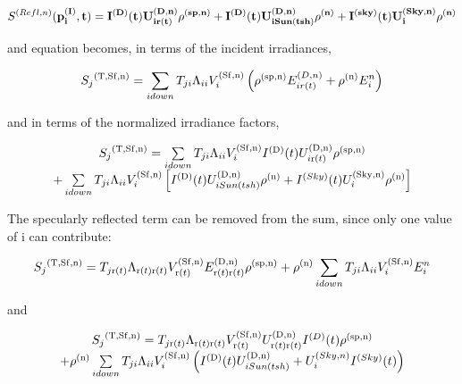 \begin{equation}
S^{(Refl,n)}(\bf{p}_i^{(I)},t) = 
  I^{(D)}(t) U_{i r(t)}^{(D,n)} \rho^{(sp,n)} +
  I^{(D)}(t) U_{i Sun(tsh)}^{(D,n)} \rho^{(n)} +
  I^{(sky)}(t) U_i^{(Sky,n)} \rho^{(n)}
\end{equation}

and equation becomes, in terms of the incident irradiances,

\begin{equation}
{S_j}^{{\rm{(T, Sf, n)}}} = \sum\limits_{i{\rm{ }}down} {{T_{ji}}{\Lambda_{ii}}V_i^{{\rm{(Sf, n)}}}\left( {{\rho ^{{\rm{(sp, n)}}}}E_{i{\rm{ }}r(t)}^{(D,n)} + {\rho ^{{\rm{(n)}}}}E_i^n} \right)}
\end{equation}

and in terms of the normalized irradiance factors,

\begin{equation}
\begin{array}{c}{S_j}^{{\rm{(T, Sf, n)}}} = \sum\limits_{i{\rm{ }}down} {{T_{ji}}{\Lambda_{ii}}V_i^{{\rm{(Sf, n)}}}{I^{{\rm{(D)}}}}(t)U_{i{\rm{ r(}}t{\rm{)}}}^{{\rm{(D,n)}}}{\rho ^{{\rm{(sp, n)}}}}} \\ + \sum\limits_{i{\rm{ }}down} {{T_{ji}}{\Lambda_{ii}}V_i^{{\rm{(Sf, n)}}}\left[ {{I^{{\rm{(D)}}}}(t)U_{i{\rm{ }}Sun(tsh)}^{{\rm{(D,n)}}}{\rho ^{{\rm{(n)}}}} + {I^{(Sky)}}(t)U_i^{{\rm{(Sky,n)}}}{\rho ^{{\rm{(n)}}}}} \right]} \end{array}
\end{equation}

The specularly reflected term can be removed from the sum, since only one value of i can contribute:

\begin{equation}
{S_j}^{{\rm{(T, Sf, n)}}} = {T_{j{\rm{ r(}}t{\rm{)}}}}{\Lambda_{{\rm{ r(}}t{\rm{) r(}}t{\rm{)}}}}V_{{\rm{ r(}}t{\rm{)}}}^{{\rm{(Sf, n)}}}E_{{\rm{ r(}}t{\rm{) r(}}t{\rm{)}}}^{{\rm{(D,n)}}}{\rho ^{{\rm{(sp, n)}}}} + {\rho ^{{\rm{(n)}}}}\sum\limits_{i{\rm{ }}down} {{T_{ji}}{\Lambda_{ii}}V_i^{{\rm{(Sf, n)}}}E_i^n}
\end{equation}

and

\begin{equation}
\begin{array}{c}{S_j}^{{\rm{(T, Sf, n)}}} = {T_{j{\rm{ r(}}t{\rm{)}}}}{\Lambda_{{\rm{ r(}}t{\rm{) r(}}t{\rm{)}}}}V_{{\rm{ r(}}t{\rm{)}}}^{{\rm{(Sf, n)}}}U_{{\rm{ r(}}t{\rm{) r(}}t{\rm{)}}}^{{\rm{(D,n)}}}{I^{(D)}}(t){\rho ^{{\rm{(sp, n)}}}}\\ + {\rho ^{{\rm{(n)}}}}\sum\limits_{i{\rm{ }}down} {{T_{ji}}{\Lambda_{ii}}V_i^{{\rm{(Sf, n)}}}\left( {{I^{{\rm{(D)}}}}(t)U_{i{\rm{ }}Sun(tsh)}^{{\rm{(D,n)}}} + U_i^{(Sky,n)}{I^{(Sky)}}(t)} \right)} \end{array}
\end{equation}


